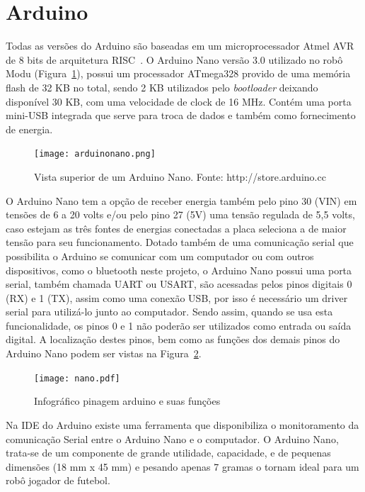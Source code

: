 \documentclass[a4paper,12pt,portuguese]{ufms-cpcx}
\begin{document}
\section{Arduino}\label{arduinonano}
Todas as versões do Arduino são baseadas em um microprocessador Atmel AVR de 8 bits de arquitetura RISC~\cite{arduinoemacao}. O Arduino Nano versão 3.0 utilizado no robô Modu (Figura~\ref{fig:arduinonano}), possui um processador ATmega328 provido de uma memória flash de 32 KB no total, sendo 2 KB utilizados pelo \textit{bootloader} deixando disponível 30 KB, com uma velocidade de clock de 16 MHz. Contém uma porta mini-USB integrada que serve para troca de dados e também como fornecimento de energia. 
\begin{figure}[H]
	\centering
	\texttt{[image: arduinonano.png]}
	\caption{Vista superior de um Arduino Nano. Fonte: http://store.arduino.cc}
	\label{fig:arduinonano}
\end{figure}
O Arduino Nano tem a opção de receber energia também pelo pino 30 (VIN) em tensões de 6 a 20 volts e/ou pelo pino 27 (5V) uma tensão regulada de 5,5 volts, caso estejam as três fontes de energias conectadas a placa seleciona a de maior tensão para seu funcionamento. Dotado também de uma comunicação serial que possibilita o Arduino se comunicar com um computador ou com outros dispositivos, como o bluetooth neste projeto, o Arduino Nano possui uma porta serial, também chamada UART ou USART, são acessadas pelos pinos digitais 0 (RX) e 1 (TX), assim como uma conexão USB, por isso é necessário um driver serial para utilizá-lo junto ao computador. Sendo assim, quando se usa esta funcionalidade, os pinos 0 e 1 não poderão ser utilizados como entrada ou saída digital. A localização destes pinos, bem como as funções dos demais pinos do Arduino Nano podem ser vistas na Figura~\ref{fig:pinagem}.
\begin{figure}[H]
	\centering
	\texttt{[image: nano.pdf]}
	\caption{Infográfico pinagem arduino e suas funções}
	\label{fig:pinagem}
\end{figure}
Na IDE do Arduino existe uma ferramenta que disponibiliza o monitoramento da comunicação Serial entre o Arduino Nano e o computador. O Arduino Nano, trata-se de um componente de grande utilidade, capacidade, e de pequenas dimensões (18 mm x 45 mm) e pesando apenas 7 gramas o tornam ideal para um robô jogador de futebol. 
\end{document}
